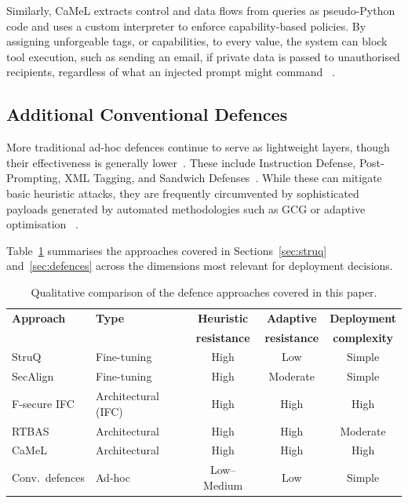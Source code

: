 Similarly, CaMeL extracts control and data flows from queries as pseudo-Python
code and uses a custom interpreter to enforce capability-based policies. By
assigning unforgeable tags, or capabilities, to every value, the system can
block tool execution, such as sending an email, if private data is passed to
unauthorised recipients, regardless of what an injected prompt might command
~\parencite{debenedetti2025defeating}.

\subsection{Additional Conventional Defences}

More traditional ad-hoc defences continue to serve as lightweight layers,
though their effectiveness is generally lower~\parencite{chen2025secalign}.
These include Instruction Defense, Post-Prompting, XML Tagging, and Sandwich
Defenses~\parencite{liu2023promptinjection}. While these can mitigate basic
heuristic attacks, they are frequently circumvented by sophisticated payloads
generated by automated methodologies such as GCG or adaptive optimisation
~\parencite{chen2025secalign}.

Table~\ref{tab:defence-comparison} summarises the approaches covered in
Sections~\ref{sec:struq} and~\ref{sec:defences} across the dimensions most
relevant for deployment decisions.

\begin{table}[h]
\centering
\small
\caption{Qualitative comparison of the defence approaches covered in this
paper.}
\label{tab:defence-comparison}
\begin{tabular}{l l c c c}
\toprule
\textbf{Approach}
& \textbf{Type}
& \textbf{Heuristic}
& \textbf{Adaptive}
& \textbf{Deployment} \\
&
&
\textbf{resistance}
&
\textbf{resistance}
&
\textbf{complexity} \\
\midrule
StruQ           & Fine-tuning         & High        & Low      & Simple   \\
SecAlign        & Fine-tuning         & High        & Moderate & Simple   \\
F-secure IFC    & Architectural (IFC) & High        & High     & High     \\
RTBAS           & Architectural       & High        & High     & Moderate \\
CaMeL           & Architectural       & High        & High     & High     \\
Conv.\ defences & Ad-hoc              & Low--Medium & Low      & Simple   \\
\bottomrule
\end{tabular}
\end{table}

